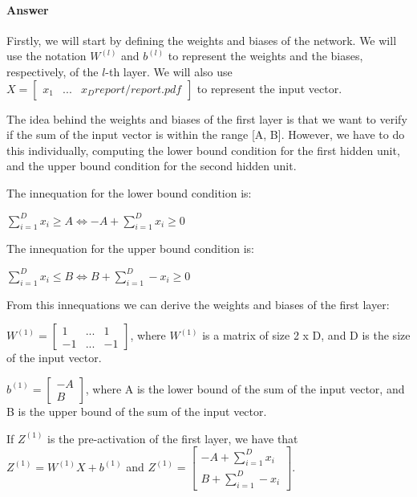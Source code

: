 \documentclass{article}
\begin{document}
\paragraph{Answer}

Firstly, we will start by defining the weights and biases of the network. We will use the notation
\( W^{(l)} \) and \( b^{(l)} \) to represent the weights and the biases, respectively, of the \( l \)-th layer. 
We will also use $X = \begin{bmatrix}
    x_1 & ... & x_Dreport/report.pdf
\end{bmatrix}
$ to represent the input vector.

\bigskip

The idea behind the weights and biases of the first layer is that we want to verify if the sum of the input vector is within the range [A, B].
However, we have to do this individually, computing the lower bound condition for the first hidden unit, 
and the upper bound condition for the second hidden unit.

\bigskip

The innequation for the lower bound condition is:

\bigskip

$ \sum_{i=1}^{D} x_i \geq A \iff -A + \sum_{i=1}^{D} x_i \geq 0$

The innequation for the upper bound condition is:

\bigskip

$ \sum_{i=1}^{D} x_i \leq B \iff B + \sum_{i=1}^{D}- x_i \geq 0$

\bigskip

From this innequations we can derive the weights and biases of the first layer:

\bigskip

\( W^{(1)} = \begin{bmatrix}
    1  & ... & 1  \\
    -1 & ... & -1
\end{bmatrix}
\), where \(W^{(1)}\) is a matrix of size 2 x D, and D is the size of the input vector.

\(b^{(1)} = \begin{bmatrix}
    -A \\
    B
\end{bmatrix}
\), where A is the lower bound of the sum of the input vector, and B is the upper bound of the sum of the input vector. 

\bigskip

If $Z^{(1)}$ is the pre-activation of the first layer, we have that $Z^{(1)} = W^{(1)}X + b^{(1)}$ and
$Z^{(1)} = \begin{bmatrix}
    -A + \sum_{i=1}^{D} x_i\\
    B + \sum_{i=1}^{D}- x_i
\end{bmatrix}
$.
\end{document}
